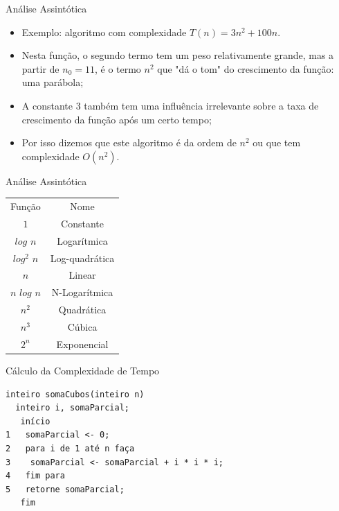 \documentclass[12pt,table,xcolor={dvipsnames}]{beamer}
\begin{document}
\begin{frame}[fragile]{Análise Assintótica}
\begin{itemize}
\item Exemplo: algoritmo com complexidade $T(n) = 3n^2 + 100n$.
\item Nesta função, o segundo termo tem um peso relativamente grande, mas a partir de $n_0 = 11$, é o termo $n^2$ que "dá o tom" do crescimento da função: uma parábola;
\item A constante 3 também tem uma influência irrelevante sobre a taxa de crescimento da função após um certo tempo;
\item Por isso dizemos que este algoritmo é da ordem de $n^2$ ou que tem complexidade $O(n^2)$.
\end{itemize}
\end{frame}

\begin{frame}[fragile]{Análise Assintótica}
          
\begin{center}
\begin{tabular}{c c}
Função & Nome \\
$1$ & Constante \\ 
$log$  $n$ & Logarítmica \\
$log^2$ $n$ & Log-quadrática\\
$n$ & Linear \\
$n$ $log$ $n$ & N-Logarítmica \\
$n^2$ & Quadrática \\
$n^3$ & Cúbica \\
$2^n$ & Exponencial 
\end{tabular}           
\end{center}
\end{frame}

\begin{frame}[fragile]{Cálculo da Complexidade de Tempo}
\begin{lstlisting}
inteiro somaCubos(inteiro n)
  inteiro i, somaParcial;
   início
1   somaParcial <- 0;
2   para i de 1 até n faça
3    somaParcial <- somaParcial + i * i * i;
4   fim para
5   retorne somaParcial;
   fim
\end{lstlisting}
\end{frame}
\end{document}
